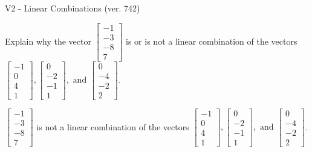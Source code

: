 \begin{exercise}
  \begin{exerciseTitle}V2 - Linear Combinations (ver. 742)\end{exerciseTitle}
  \begin{exerciseStatement}
    Explain why the vector \(\left[\begin{array}{c}
-1 \\
-3 \\
-8 \\
7
\end{array}\right]\)  is or is not a linear 
	combination of the vectors \(\left[\begin{array}{c}
-1 \\
0 \\
4 \\
1
\end{array}\right] , \left[\begin{array}{c}
0 \\
-2 \\
-1 \\
1
\end{array}\right] , \text{ and } \left[\begin{array}{c}
0 \\
-4 \\
-2 \\
2
\end{array}\right]\).
	


  \end{exerciseStatement}
  \begin{exerciseAnswer}
   \(\left[\begin{array}{c}
-1 \\
-3 \\
-8 \\
7
\end{array}\right]\) 
  	 is not  
	a linear combination of the vectors \(\left[\begin{array}{c}
-1 \\
0 \\
4 \\
1
\end{array}\right] , \left[\begin{array}{c}
0 \\
-2 \\
-1 \\
1
\end{array}\right] , \text{ and } \left[\begin{array}{c}
0 \\
-4 \\
-2 \\
2
\end{array}\right]\).

	
  


  \end{exerciseAnswer}
\end{exercise}